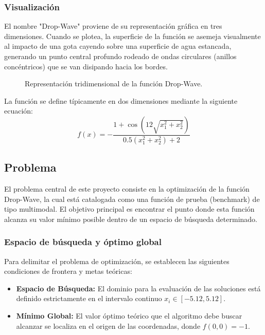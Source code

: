 \subsubsection{Visualización}
El nombre "Drop-Wave" proviene de su representación gráfica en tres dimensiones. Cuando se plotea, la superficie de la función se asemeja
visualmente al impacto de una gota cayendo sobre una superficie de agua estancada, generando un punto central profundo rodeado de ondas circulares
(anillos concéntricos) que se van disipando hacia los bordes.

\begin{figure}[htbp]
    \centering
    \caption*{Representación tridimensional de la función Drop-Wave.}
    \label{fig:drop_wave_3d}
\end{figure}

La función se define típicamente en dos dimensiones mediante la siguiente ecuación:
$$f(x) = -\frac{1 + \cos(12\sqrt{x_{1}^{2} + x_{2}^{2}})}{0.5(x_{1}^{2} + x_{2}^{2}) + 2}$$

\subsection{Problema}

El problema central de este proyecto consiste en la optimización de la función Drop-Wave, la cual está catalogada como una función de prueba (benchmark) de tipo multimodal.
El objetivo principal es encontrar el punto donde esta función alcanza su valor mínimo posible dentro de un espacio de búsqueda determinado.

\subsubsection{Espacio de búsqueda y óptimo global}
Para delimitar el problema de optimización, se establecen las siguientes condiciones de frontera y metas teóricas:
\begin{itemize}
    \item \textbf{Espacio de Búsqueda:} El dominio para la evaluación de las soluciones está definido estrictamente en el intervalo continuo $x_{i} \in [-5.12, 5.12]$.
    \item \textbf{Mínimo Global:} El valor óptimo teórico que el algoritmo debe buscar alcanzar se localiza en el origen de las coordenadas, donde $f(0,0) = -1$.
\end{itemize}

